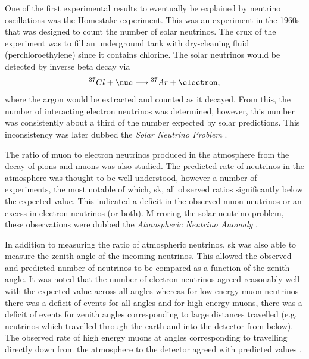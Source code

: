 One of the first experimental results to eventually be explained by neutrino oscillations was the Homestake experiment. This was an experiment in the 1960s that was designed to count the number of solar neutrinos. The crux of the experiment was to fill an underground tank with dry-cleaning fluid (perchloroethylene) since it contains chlorine. The solar neutrinos would be detected by inverse beta decay via
\begin{equation}
    ^{37}Cl + \nue \longrightarrow {^{37}Ar} + \electron,
\end{equation}
where the argon would be extracted and counted as it decayed. From this, the number of interacting electron neutrinos was determined, however, this number was consistently about a third of the number expected by solar predictions. This inconsistency was later dubbed the \textit{Solar Neutrino Problem} \cite{Homestake}.

The ratio of muon to electron neutrinos produced in the atmosphere from the decay of pions and muons was also studied. The predicted rate of neutrinos in the atmosphere was thought to be well understood, however a number of experiments, the most notable of which, \Gls{sk}, all observed ratios significantly below the expected value. This indicated a deficit in the observed muon neutrinos or an excess in electron neutrinos (or both). Mirroring the solar neutrino problem, these observations were dubbed the \textit{Atmospheric Neutrino Anomaly} \cite{Atmospheric_anomaly}.

In addition to measuring the ratio of atmospheric neutrinos, \Gls{sk} was also able to measure the zenith angle of the incoming neutrinos. This allowed the observed and predicted number of neutrinos to be compared as a function of the zenith angle. It was noted that the number of electron neutrinos agreed reasonably well with the expected value across all angles whereas for low-energy muon neutrinos there was a deficit of events for all angles and for high-energy muons, there was a deficit of events for zenith angles corresponding to large distances travelled (e.g. neutrinos which travelled through the earth and into the detector from below). The observed rate of high energy muons at angles corresponding to travelling directly down from the atmosphere to the detector agreed with predicted values \cite{SuperK_neutrino_oscillations}. 

